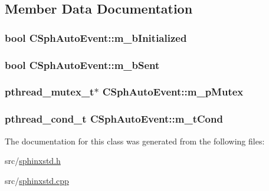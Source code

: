 \subsection{Member Data Documentation}
\hypertarget{classCSphAutoEvent_a4fcafeb9de9298f736d43f9453527454}{
\subsubsection[{m\-\_\-b\-Initialized}]{\setlength{\rightskip}{0pt plus 5cm}bool C\-Sph\-Auto\-Event\-::m\-\_\-b\-Initialized\hspace{0.3cm}{\ttfamily [protected]}}}\label{classCSphAutoEvent_a4fcafeb9de9298f736d43f9453527454}
\hypertarget{classCSphAutoEvent_a2d58681011e343892baba94e7693a60c}{
\subsubsection[{m\-\_\-b\-Sent}]{\setlength{\rightskip}{0pt plus 5cm}bool C\-Sph\-Auto\-Event\-::m\-\_\-b\-Sent\hspace{0.3cm}{\ttfamily [protected]}}}\label{classCSphAutoEvent_a2d58681011e343892baba94e7693a60c}
\hypertarget{classCSphAutoEvent_a9860d49c0d3c508561cf7874a4e2f8a7}{
\subsubsection[{m\-\_\-p\-Mutex}]{\setlength{\rightskip}{0pt plus 5cm}pthread\-\_\-mutex\-\_\-t$\ast$ C\-Sph\-Auto\-Event\-::m\-\_\-p\-Mutex\hspace{0.3cm}{\ttfamily [protected]}}}\label{classCSphAutoEvent_a9860d49c0d3c508561cf7874a4e2f8a7}
\hypertarget{classCSphAutoEvent_a24395747674c91fc8e840c49feb8bfa6}{
\subsubsection[{m\-\_\-t\-Cond}]{\setlength{\rightskip}{0pt plus 5cm}pthread\-\_\-cond\-\_\-t C\-Sph\-Auto\-Event\-::m\-\_\-t\-Cond\hspace{0.3cm}{\ttfamily [protected]}}}\label{classCSphAutoEvent_a24395747674c91fc8e840c49feb8bfa6}


The documentation for this class was generated from the following files\-:\begin{DoxyCompactItemize}
\item 
src/\hyperlink{sphinxstd_8h}{sphinxstd.\-h}\item 
src/\hyperlink{sphinxstd_8cpp}{sphinxstd.\-cpp}\end{DoxyCompactItemize}
